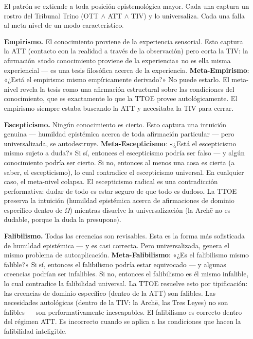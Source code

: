 \documentclass[10pt, openany, oneside]{book}
\begin{document}
El patrón se extiende a toda posición epistemológica mayor. Cada una captura un rostro del Tribunal Trino (OTT $\wedge$ ATT $\wedge$ TIV) y lo universaliza. Cada una falla al meta-nivel de un modo característico.

\textbf{Empirismo.} El conocimiento proviene de la experiencia sensorial. Esto captura la ATT (contacto con la realidad a través de la observación) pero corta la TIV: la afirmación «todo conocimiento proviene de la experiencia» no es ella misma experiencial --- es una tesis filosófica acerca de la experiencia. \textbf{Meta-Empirismo}: «¿Está el empirismo mismo empíricamente derivado?» No puede estarlo. El meta-nivel revela la tesis como una afirmación estructural sobre las condiciones del conocimiento, que es exactamente lo que la TTOE provee autológicamente. El empirismo siempre estaba buscando la ATT y necesitaba la TIV para cerrar.

\textbf{Escepticismo.} Ningún conocimiento es cierto. Esto captura una intuición genuina --- humildad epistémica acerca de toda afirmación particular --- pero universalizada, se autodestruye. \textbf{Meta-Escepticismo}: «¿Está el escepticismo mismo sujeto a duda?» Si sí, entonces el escepticismo podría ser falso --- y algún conocimiento podría ser cierto. Si no, entonces al menos una cosa es cierta (a saber, el escepticismo), lo cual contradice el escepticismo universal. En cualquier caso, el meta-nivel colapsa. El escepticismo radical es una contradicción performativa: dudar de todo es estar seguro de que todo es dudoso. La TTOE preserva la intuición (humildad epistémica acerca de afirmaciones de dominio específico dentro de $\Omega$) mientras disuelve la universalización (la Arch\={e} no es dudable, porque la duda la presupone).

\textbf{Falibilismo.} Todas las creencias son revisables. Esta es la forma más sofisticada de humildad epistémica --- y es casi correcta. Pero universalizada, genera el mismo problema de autoaplicación. \textbf{Meta-Falibilismo}: «¿Es el falibilismo mismo falible?» Si sí, entonces el falibilismo podría estar equivocado --- y algunas creencias podrían ser infalibles. Si no, entonces el falibilismo es él mismo infalible, lo cual contradice la falibilidad universal. La TTOE resuelve esto por tipificación: las creencias de dominio específico (dentro de la ATT) son falibles. Las necesidades autológicas (dentro de la TIV: la Arch\={e}, las Tres Leyes) no son falibles --- son performativamente inescapables. El falibilismo es correcto dentro del régimen ATT. Es incorrecto cuando se aplica a las condiciones que hacen la falibilidad inteligible.
\end{document}

